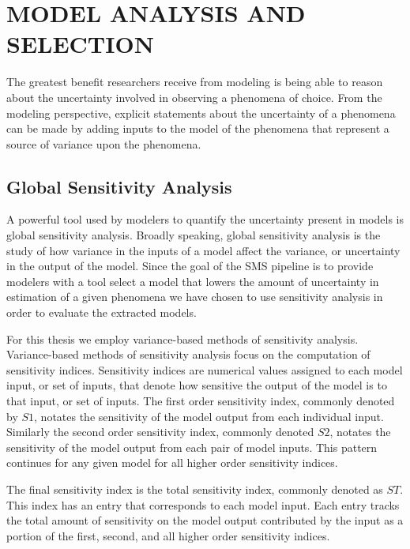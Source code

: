 \chapter{MODEL ANALYSIS AND SELECTION\label{chapter:analysis}}

The greatest benefit researchers receive from modeling is being able to reason about the uncertainty involved in observing a phenomena of choice. From the modeling perspective, explicit statements about the uncertainty of a phenomena can be made by adding inputs to the model of the phenomena that represent a source of variance upon the phenomena.


\section{Global Sensitivity Analysis\label{sec:sens_analysis}}
A powerful tool used by modelers to quantify the uncertainty present in models is global sensitivity analysis. Broadly speaking, global sensitivity analysis is the study of how variance in the inputs of a model affect the variance, or uncertainty in the output of the model. Since the goal of the SMS pipeline is to provide modelers with a tool select a model that lowers the amount of uncertainty in estimation of a given phenomena we have chosen to use sensitivity analysis in order to evaluate the extracted models.

For this thesis we employ variance-based methods of sensitivity analysis.
Variance-based methods of sensitivity analysis focus on the computation of sensitivity indices. Sensitivity indices are numerical values assigned to each model input, or set of inputs, that denote how sensitive the output of the model is to that input, or set of inputs. The first order sensitivity index, commonly denoted by $S1$, notates the sensitivity of the model output from each individual input. Similarly the second order sensitivity index, commonly denoted $S2$, notates the sensitivity of the model output from each pair of model inputs. This pattern continues for any given model for all higher order sensitivity indices.

The final sensitivity index is the total sensitivity index, commonly denoted as $ST$. This index has an entry that corresponds to each model input. Each entry tracks the total amount of sensitivity on the model output contributed by the input as a portion of the first, second, and all higher order sensitivity indices.

